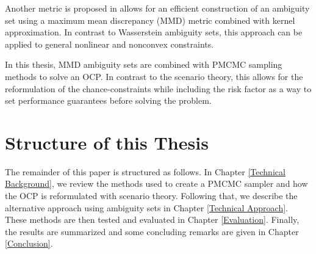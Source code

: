 Another metric is proposed in \cite{Yassine_22} allows for an efficient construction of an ambiguity set using a maximum mean discrepancy (MMD) metric combined with kernel approximation. In contrast to Wasserstein ambiguity sets, this approach can be applied to general nonlinear and nonconvex constraints. 

In this thesis, MMD ambiguity sets are combined with PMCMC sampling methods to solve an OCP. In contrast to the scenario theory, this allows for the reformulation of the chance-constraints while including the risk factor as a way to set performance guarantees before solving the problem.

\section{Structure of this Thesis} \label{Structure of this Thesis}

The remainder of this paper is structured as follows. In Chapter \ref{Technical Background}, we review the methods used to create a PMCMC sampler and how the OCP is reformulated with scenario theory. Following that, we describe the alternative approach using ambiguity sets in Chapter \ref{Technical Approach}. These methods are then tested and evaluated in Chapter \ref{Evaluation}. Finally, the results are summarized and some concluding remarks are given in Chapter \ref{Conclusion}.



